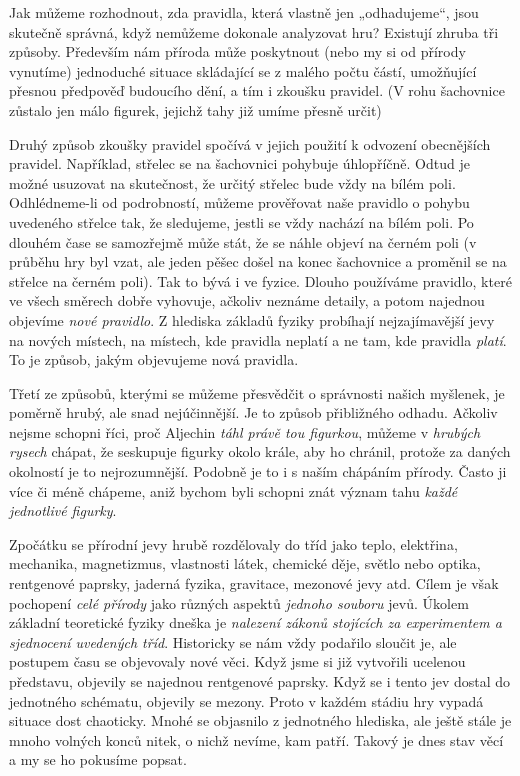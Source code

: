     Jak můžeme rozhodnout, zda pravidla, která vlastně jen „odhadujeme“, jsou skutečně správná, 
    když nemůžeme dokonale analyzovat hru? Existují zhruba tři způsoby. Především nám příroda může 
    poskytnout (nebo my si od přírody vynutíme) jednoduché situace skládající se z malého počtu 
    částí, umožňující přesnou předpověď budoucího dění, a tím i zkoušku pravidel. (V rohu 
    šachovnice zůstalo jen málo figurek, jejichž tahy již umíme přesně určit)
    
    Druhý způsob zkoušky pravidel spočívá v jejich použití k odvození obecnějších pravidel. 
    Například, střelec se na šachovnici pohybuje úhlopříčně. Odtud je možné usuzovat na skutečnost, 
    že určitý střelec bude vždy na bílém poli. Odhlédneme-li od podrobností, můžeme prověřovat naše 
    pravidlo o pohybu uvedeného střelce tak, že sledujeme, jestli se vždy nachází na bílém poli. Po 
    dlouhém čase se samozřejmě může stát, že se náhle objeví na černém poli (v průběhu hry byl 
    vzat, ale jeden pěšec došel na konec šachovnice a proměnil se na střelce na černém poli). Tak 
    to bývá i ve fyzice. Dlouho používáme pravidlo, které ve všech směrech dobře vyhovuje, ačkoliv 
    neznáme detaily, a potom najednou objevíme \emph{nové pravidlo}. Z hlediska základů fyziky 
    probíhají nejzajímavější jevy na nových místech, na místech, kde pravidla neplatí a ne tam, kde 
    pravidla \emph{platí}. To je způsob, jakým objevujeme nová pravidla.
    
    Třetí ze způsobů, kterými se můžeme přesvědčit o správnosti našich myšlenek, je poměrně hrubý, 
    ale snad nejúčinnější. Je to způsob přibližného odhadu. Ačkoliv nejsme schopni říci, proč 
    Aljechin \emph{táhl právě tou figurkou}, můžeme v \emph{hrubých rysech} chápat, že seskupuje 
    figurky okolo krále, aby ho chránil, protože za daných okolností je to nejrozumnější. Podobně 
    je to i s naším chápáním přírody. Často ji více či méně chápeme, aniž bychom byli schopni znát 
    význam tahu \emph{každé jednotlivé figurky}.
    
    Zpočátku se přírodní jevy hrubě rozdělovaly do tříd jako teplo, elektřina, mechanika, 
    magnetizmus, vlastnosti látek, chemické děje, světlo nebo optika, rentgenové paprsky, jaderná 
    fyzika, gravitace, mezonové jevy atd. Cílem je však pochopení \emph{celé přírody} jako různých 
    aspektů \emph{jednoho souboru} jevů. Úkolem základní teoretické fyziky dneška je \emph{nalezení 
    zákonů stojících za experimentem a sjednocení uvedených tříd}. Historicky se nám vždy podařilo 
    sloučit je, ale postupem času se objevovaly nové věci. Když jsme si již vytvořili ucelenou 
    představu, objevily se najednou rentgenové paprsky. Když se i tento jev dostal do jednotného 
    schématu, objevily se mezony. Proto v každém stádiu hry vypadá situace dost chaoticky. Mnohé se 
    objasnilo z jednotného hlediska, ale ještě stále je mnoho volných konců nitek, o nichž nevíme, 
    kam patří. Takový je dnes stav věcí a my se ho pokusíme popsat.
    
